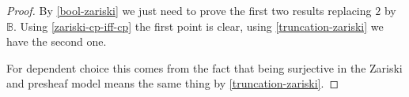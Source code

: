 \begin{proof}
By \cref{bool-zariski} we just need to prove the first two results replacing ${2}$ by $\mathbb{B}$. Using \cref{zariski-cp-iff-cp} the first point is clear, using \cref{truncation-zariski} we have the second one.

For dependent choice this comes from the fact that being surjective in the Zariski and presheaf model means the same thing by \cref{truncation-zariski}.
\end{proof}



